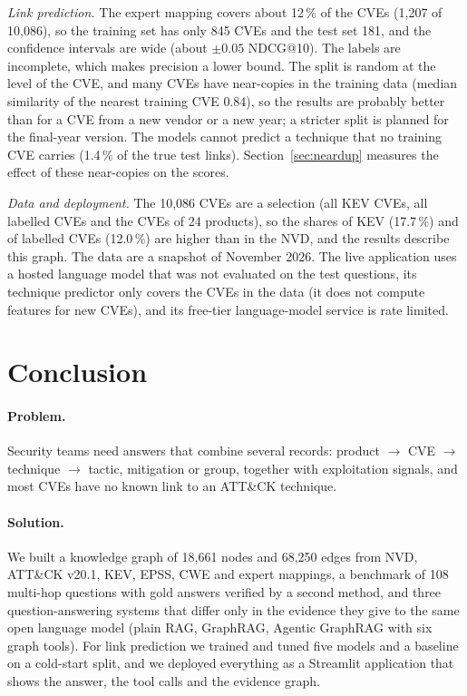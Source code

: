 \documentclass[12pt, a4paper]{article}
\begin{document}
\emph{Link prediction.} The expert mapping covers about 12\,\% of the CVEs (1,207 of 10,086), so the training set has only 845 CVEs and the test set 181, and the confidence intervals are wide (about $\pm 0.05$ NDCG@10). The labels are incomplete, which makes precision a lower bound. The split is random at the level of the CVE, and many CVEs have near-copies in the training data (median similarity of the nearest training CVE 0.84), so the results are probably better than for a CVE from a new vendor or a new year; a stricter split is planned for the final-year version. The models cannot predict a technique that no training CVE carries (1.4\,\% of the true test links). Section~\ref{sec:neardup} measures the effect of these near-copies on the scores.

\emph{Data and deployment.} The 10,086 CVEs are a selection (all KEV CVEs, all labelled CVEs and the CVEs of 24 products), so the shares of KEV (17.7\,\%) and of labelled CVEs (12.0\,\%) are higher than in the NVD, and the results describe this graph. The data are a snapshot of November 2026. The live application uses a hosted language model that was not evaluated on the test questions, its technique predictor only covers the CVEs in the data (it does not compute features for new CVEs), and its free-tier language-model service is rate limited.

\section{Conclusion}
\paragraph{Problem.} Security teams need answers that combine several records: product $\rightarrow$ CVE $\rightarrow$ technique $\rightarrow$ tactic, mitigation or group, together with exploitation signals, and most CVEs have no known link to an ATT\&CK technique.
\paragraph{Solution.} We built a knowledge graph of 18,661 nodes and 68,250 edges from NVD, ATT\&CK v20.1, KEV, EPSS, CWE and expert mappings, a benchmark of 108 multi-hop questions with gold answers verified by a second method, and three question-answering systems that differ only in the evidence they give to the same open language model (plain RAG, GraphRAG, Agentic GraphRAG with six graph tools). For link prediction we trained and tuned five models and a baseline on a cold-start split, and we deployed everything as a Streamlit application that shows the answer, the tool calls and the evidence graph.
\end{document}
